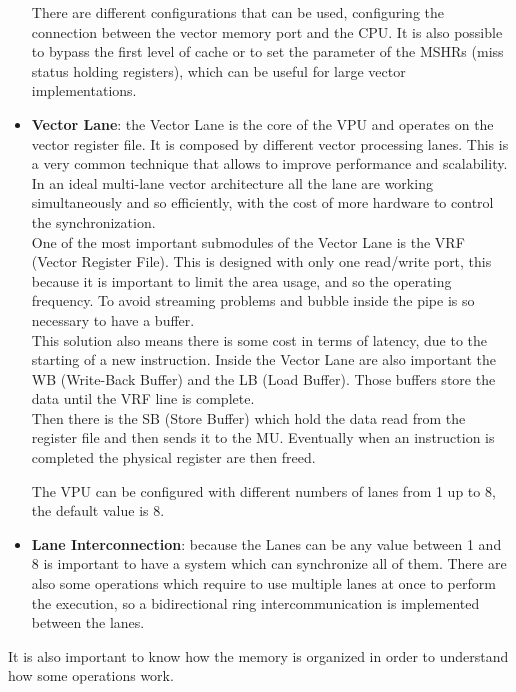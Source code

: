 \begin{itemize}
    There are different configurations that can be used, configuring the connection between the vector memory port and the CPU.
    It is also possible to bypass the first level of cache or to set the parameter of the MSHRs (miss status holding registers), which can be useful for large vector implementations.

    
    \item \textbf{Vector Lane}: the Vector Lane is the core of the VPU and operates on the vector register file. It is composed by different vector processing lanes. This is a very common technique that allows to improve performance and scalability.\\
    In an ideal multi-lane vector architecture all the lane are working simultaneously and so efficiently, with the cost of more hardware to control the synchronization.\\
    
    One of the most important submodules of the Vector Lane is the VRF (Vector Register File). This is designed with only one read/write port, this because it is important to limit the area usage, and so the operating frequency.
    To avoid streaming problems and bubble inside the pipe is so necessary to have a buffer.\\
    
    This solution also means there is some cost in terms of latency, due to the starting of a new instruction.
    Inside the Vector Lane are also important the WB (Write-Back Buffer) and the LB (Load Buffer). Those buffers store the data until the VRF line is complete.\\
    Then there is the SB (Store Buffer) which hold the data read from the  register file and then sends it to the MU. 
    Eventually when an instruction is completed the physical register are then freed. 
    
    The VPU can be configured with different numbers of lanes from 1 up to 8, the default value is 8.\\
    
    \item \textbf{Lane Interconnection}: because the Lanes can be any value between 1 and 8 is important to have a system which can synchronize all of them. There are also some operations which require to use multiple lanes at once to perform the execution, so a bidirectional ring intercommunication is implemented between the lanes.
\end{itemize}

It is also important to know how the memory is organized in order to understand how some operations work.\\

